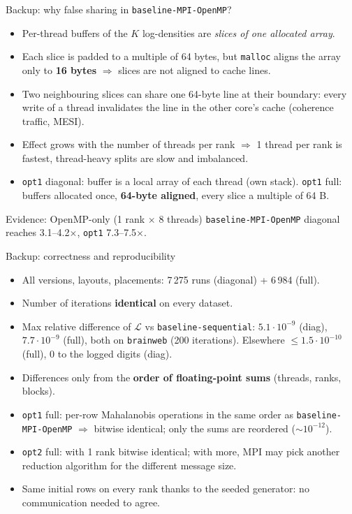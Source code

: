 \documentclass[aspectratio=169,10pt]{beamer}
\newcommand{\vseq}{\texttt{baseline-sequential}}
\newcommand{\vbase}{\texttt{baseline-MPI-OpenMP}}
\newcommand{\optone}{\texttt{opt1}}
\newcommand{\opttwo}{\texttt{opt2}}
\newcommand{\takeaway}[1]{\begin{center}\colorbox{accent!10}{\parbox{0.92\textwidth}{\centering\small #1}}\end{center}}
\begin{document}
\begin{frame}{Backup: why false sharing in \vbase{}?}
\small
\begin{itemize}
\item Per-thread buffers of the $K$ log-densities are \emph{slices of one allocated array}.
\item Each slice is padded to a multiple of 64 bytes, but \texttt{malloc} aligns the array only to \textbf{16 bytes} $\Rightarrow$ slices are not aligned to cache lines.
\item Two neighbouring slices can share one 64-byte line at their boundary: every write of a thread invalidates the line in the other core's cache (coherence traffic, MESI).
\item Effect grows with the number of threads per rank $\Rightarrow$ 1 thread per rank is fastest, thread-heavy splits are slow and imbalanced.
\item \optone{} diagonal: buffer is a local array of each thread (own stack). \optone{} full: buffers allocated once, \textbf{64-byte aligned}, every slice a multiple of 64 B.
\end{itemize}
\takeaway{Evidence: OpenMP-only (1 rank $\times$ 8 threads) \vbase{} diagonal reaches 3.1--4.2$\times$, \optone{} 7.3--7.5$\times$.}
\end{frame}

\begin{frame}{Backup: correctness and reproducibility}
\small
\begin{itemize}
\item All versions, layouts, placements: 7\,275 runs (diagonal) + 6\,984 (full).
\item Number of iterations \textbf{identical} on every dataset.
\item Max relative difference of $\mathcal{L}$ vs \vseq{}: $5.1\cdot10^{-9}$ (diag), $7.7\cdot10^{-9}$ (full), both on \texttt{brainweb} (200 iterations). Elsewhere $\le 1.5\cdot10^{-10}$ (full), 0 to the logged digits (diag).
\item Differences only from the \textbf{order of floating-point sums} (threads, ranks, blocks).
\item \optone{} full: per-row Mahalanobis operations in the same order as \vbase{} $\Rightarrow$ bitwise identical; only the sums are reordered ($\sim10^{-12}$).
\item \opttwo{} full: with 1 rank bitwise identical; with more, MPI may pick another reduction algorithm for the different message size.
\item Same initial rows on every rank thanks to the seeded generator: no communication needed to agree.
\end{itemize}
\end{frame}
\end{document}
